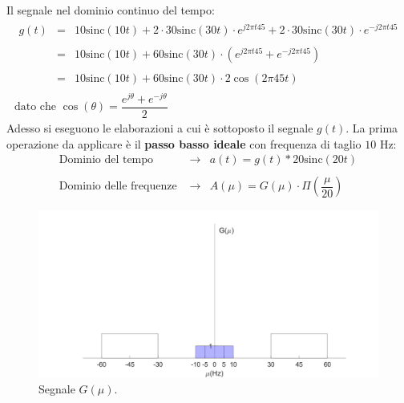 \documentclass[a4paper]{article}
\begin{document}
	Il segnale nel dominio continuo del tempo:
	\begin{gather*}
		\begin{array}{lll}
			g\left(t\right) & = & 10\mathrm{sinc}\left(10t\right) + 2 \cdot 30\mathrm{sinc}\left(30t\right) \cdot e^{j 2 \pi t 45} + 2 \cdot 30\mathrm{sinc}\left(30t\right) \cdot e^{-j 2 \pi t 45} \\
			&& \\
							& = & 10\mathrm{sinc}\left(10t\right) + 60\mathrm{sinc}\left(30t\right) \cdot \left(e^{j 2 \pi t 45} + e^{-j 2 \pi t 45}\right) \\
			&& \\
							& = & 10\mathrm{sinc}\left(10t\right) + 60\mathrm{sinc}\left(30t\right) \cdot 2\cos\left(2\pi 45 t\right)
		\end{array}\\
		\text{dato che } \cos\left(\theta\right) = \dfrac{e^{j\theta} + e^{-j \theta}}{2}
	\end{gather*}
	Adesso si eseguono le elaborazioni a cui è sottoposto il segnale $g\left(t\right)$. La prima operazione da applicare è il \textbf{passo basso ideale} con frequenza di taglio $10$ Hz:
	\begin{equation*}
		\begin{array}{lll}
			\text{Dominio del tempo } & \longrightarrow & a\left(t\right) = g\left(t\right) * 20\mathrm{sinc}\left(20t\right) \\
			&& \\
			\text{Dominio delle frequenze } & \longrightarrow & A\left(\mu\right) = G\left(\mu\right) \cdot \Pi\left(\dfrac{\mu}{20}\right)
		\end{array}
	\end{equation*}
	\begin{figure}[!htp]
		\centering
		\includegraphics[width=\textwidth]{img/segnale_G.PNG}
		\caption*{Segnale $G\left(\mu\right)$.}
	\end{figure}
	
\end{document}
